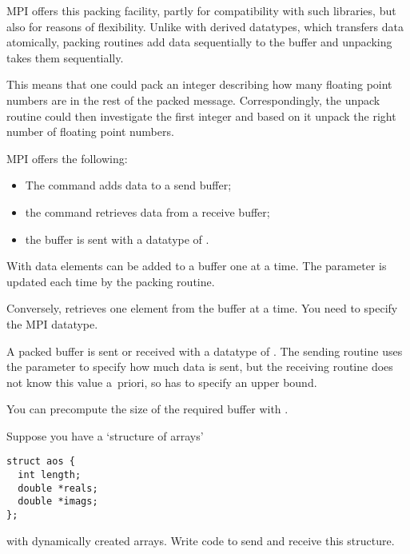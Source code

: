 MPI offers this packing facility, partly for compatibility with such libraries,
but also for reasons of flexibility. Unlike with derived datatypes,
which transfers data atomically, packing routines add data sequentially
to the buffer and unpacking takes them sequentially. 

This means that 
one could pack an integer describing how many floating point numbers
are in the rest of the packed message. 
Correspondingly, the unpack routine could then investigate the first integer
and based on it unpack the right number of floating point numbers.

MPI offers the following:
\begin{itemize}
\item The  command adds data to a send buffer;
\item the  command retrieves data from a receive buffer;
\item the buffer is sent with a datatype of .
\end{itemize}

With  data elements can be added 
to a buffer one at a time. The  parameter is updated
each time by the packing routine.

Conversely,  retrieves one element
from the buffer at a time. You need to specify the MPI datatype.

A packed buffer is sent or received with a datatype of
. The sending routine uses the 
parameter to specify how much data is sent, but the receiving routine
does not know this value a~priori, so has to specify an upper bound.


You can precompute the size of the required buffer with
%
.
%

\begin{exercise}
  \label{ex:packAOS}
  Suppose you have a `structure of arrays'
\begin{lstlisting}
struct aos {
  int length;
  double *reals;
  double *imags;
};
\end{lstlisting}
  with dynamically created arrays. Write code to send and receive this
  structure.
\end{exercise}
